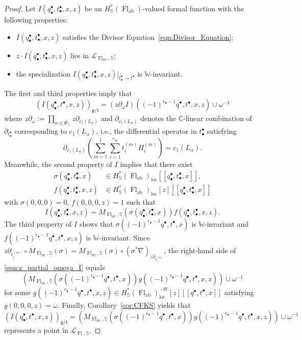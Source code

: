 \documentclass[10pt,a4paper]{amsart}
\newcommand{\C}{\mathbb{C}}
\newcommand{\FlG}{\operatorname{Fl}}
\newcommand{\FlT}{\operatorname{Fl}_{\operatorname{ab}}}
\newcommand{\W}{\mathbb{W}}
\newcommand{\bbS}{\mathbb{S}}
\newcommand{\cL}{\mathcal{L}}
\newcommand{\gt}{{\mathfrak{g}/\mathfrak{t}}}
\newcommand{\loc}{{\operatorname{loc}}}
\begin{document}
\begin{proof} 
Let $I(q^\bullet_\bullet,t_\bullet^\bullet,x,z)$ be an $H^*_\bbS(\FlT)$-valued formal function with the following properties:
\begin{itemize}
    \item 
    $I(q^\bullet_\bullet,t_\bullet^\bullet,x,z)$ satisfies the Divisor Equation~\eqref{eqn:Divisor_Equation};
    \item 
    $z\cdot I(q^\bullet_\bullet,t_\bullet^\bullet,x,z)$ lies in $\cL_{\FlT,\bbS}$;
    \item 
    the specialization $I(q^\bullet_\bullet,t^\bullet_\bullet,x,z)|_{t_\bullet^\bullet\to t^\bullet}$ is $\W$-invariant.
\end{itemize}
The first and third properties imply that 
\begin{equation}\label{eqn:z_partial_omega_I}
    (I(q^\bullet_\bullet,t^\bullet,x,z))_\gt = (z\partial_\omega I) ((-1)^{r_\bullet-1}q^\bullet,t^\bullet,x,z) \cup \omega^{-1}
\end{equation}
where $z\partial_\omega:=\prod_{\alpha\in\Phi_+} z\partial_{c_1(L_\alpha)}$ and $\partial_{c_1(L_\alpha)}$ denotes the $\C$-linear combination of $\partial_{t_\bullet^\bullet}$ corresponding to $c_1(L_\alpha)$, i.e., the differential operator in $t_\bullet^\bullet$ satisfying 
\[
\partial_{c_1(L_\alpha)} \left( \sum_{m=1}^l \sum_{i=1}^{r_m} t^{(m)}_i H^{(m)}_i \right) = c_1(L_\alpha).
\]
Meanwhile, the second property of $I$ implies that there exist 
\begin{align*}
    \sigma(q^\bullet_\bullet,t^\bullet_\bullet,x) &\in H^*_\bbS(\FlT)_\loc[\![q^\bullet_\bullet,t^\bullet_\bullet,x]\!], \\
    f(q^\bullet_\bullet,t^\bullet_\bullet,x,z) &\in H^*_\bbS(\FlT)_\loc[z][\![q^\bullet_\bullet,t^\bullet_\bullet,x]\!]
\end{align*}
with $\sigma(0,0,0)=0$, $f(0,0,0,z)=1$ such that
\[
I(q^\bullet_\bullet,t_\bullet^\bullet,x,z) = M_{\FlT,\bbS}(\sigma(q^\bullet_\bullet,t^\bullet_\bullet,x)) f(q^\bullet_\bullet,t^\bullet_\bullet,x,z).
\]
The third property of $I$ shows that $\sigma((-1)^{r_\bullet-1}q^\bullet,t^\bullet,x)$ is $\W$-invariant and $f((-1)^{r_\bullet-1}q^\bullet,t^\bullet,x,z)$ is $\W$-invariant.
Since $z\partial_{t^{(m)}_i}\circ M_{\FlT,\bbS}(\sigma) = M_{\FlT,\bbS}(\sigma) \circ (\sigma^*\nabla)_{z\partial_{t^{(m)}_i}}$, the right-hand side of \eqref{eqn:z_partial_omega_I} equals
\[
(M_{\FlT,\bbS}(\sigma((-1)^{r_\bullet-1}q^\bullet,t^\bullet,x)) g((-1)^{r_\bullet-1}q^\bullet,t^\bullet,x,z))\cup\omega^{-1}
\]
for some $g((-1)^{r_\bullet-1}q^\bullet,t^\bullet,x,z)\in H^*_\bbS(\FlT)^{-W}_\loc[z][\![q^\bullet,t^\bullet,x]\!]$ satisfying
$g(0,0,0,z)=\omega$.
Finally, Corollary~\ref{cor:CFKS} yields that 
\[
(I(q^\bullet_\bullet,t^\bullet,x,z))_\gt=(M_{\FlT,\bbS}(\sigma((-1)^{r_\bullet-1}q^\bullet,t^\bullet,x)) g((-1)^{r_\bullet-1}q^\bullet,t^\bullet,x,z))\cup\omega^{-1}
\]
represents a point in $\cL_{\FlG,\bbS}$.
\end{proof}
\end{document}
